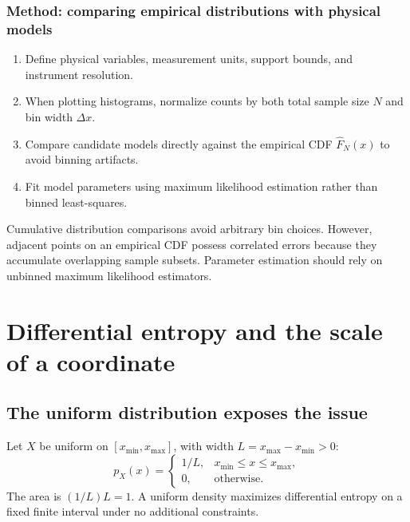 \subsubsection*{Method: comparing empirical distributions with physical models}
\begin{enumerate}
\item Define physical variables, measurement units, support bounds, and instrument resolution.
\item When plotting histograms, normalize counts by both total sample size $N$ and bin width $\Delta x$.
\item Compare candidate models directly against the empirical CDF $\widehat F_N(x)$ to avoid binning artifacts.
\item Fit model parameters using maximum likelihood estimation rather than binned least-squares.
\end{enumerate}
Cumulative distribution comparisons avoid arbitrary bin choices. However, adjacent points on an empirical CDF possess correlated errors because they accumulate overlapping sample subsets. Parameter estimation should rely on unbinned maximum likelihood estimators.

\section{Differential entropy and the scale of a coordinate}
\label{sec:l05-entropy}
\subsection{The uniform distribution exposes the issue}
\label{subsec:l05-uniform}
Let $X$ be uniform on $[x_{\min},x_{\max}]$, with width $L=x_{\max}-x_{\min}>0$:
\begin{equation}
p_X(x)=\begin{cases}1/L,&x_{\min}\leq x\leq x_{\max},\\0,&\text{otherwise}.\end{cases}
\label{eq:l05-uniform}
\end{equation}
The area is $(1/L)L=1$. A uniform density maximizes differential entropy on a fixed finite interval under no additional constraints.

